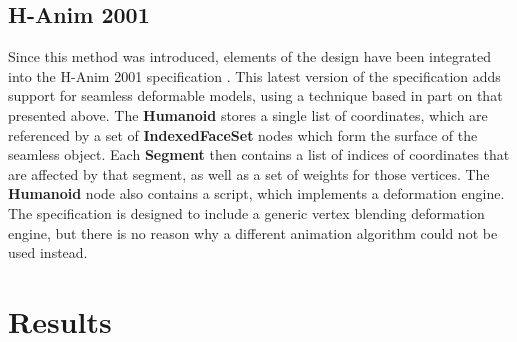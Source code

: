 \subsection{\label{sec:skeletalanim:vrml:hanim2001}H-Anim 2001}

Since this method was introduced, elements of the design have been integrated into the H-Anim 2001 specification \cite{HANIM2001}. This latest version of the specification adds support for seamless deformable models, using a technique based in part on that presented above. The {\bf Humanoid} stores a single list of coordinates, which are referenced by a set of {\bf IndexedFaceSet} nodes which form the surface of the seamless object. Each {\bf Segment} then contains a list of indices of coordinates that are affected by that segment, as well as a set of weights for those vertices. The {\bf Humanoid} node also contains a script, which implements a deformation engine. The specification is designed to include a generic vertex blending deformation engine, but there is no reason why a different animation algorithm could not be used instead.

\section{\label{sec:skeletalanim:results}Results}

